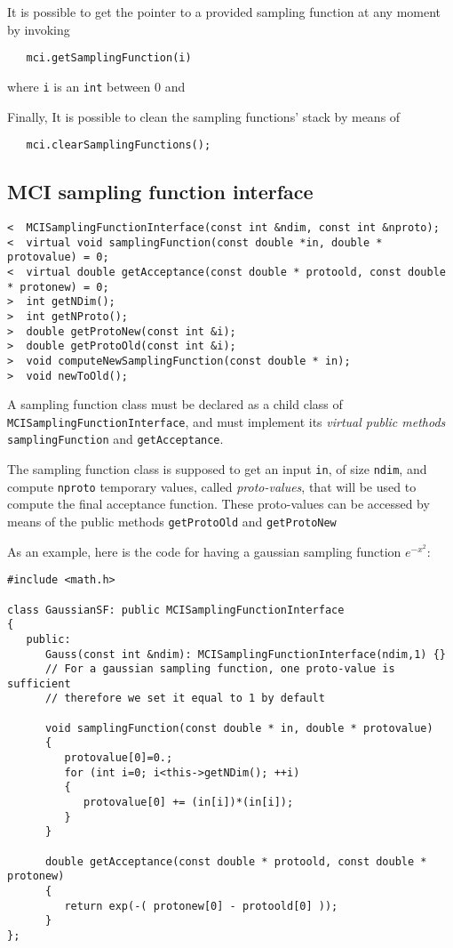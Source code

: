 \documentclass[11pt,a4paper,twoside]{article}
\begin{document}
It is possible to get the pointer to a provided sampling function at any moment by invoking
\begin{verbatim}
   mci.getSamplingFunction(i)
\end{verbatim}
where \verb+i+ is an \verb+int+ between $0$ and

Finally, It is possible to clean the sampling functions' stack by means of
\begin{verbatim}
   mci.clearSamplingFunctions();
\end{verbatim}


\subsection{MCI sampling function interface} %
\label{sub:mci_sampling_function_interface}

\begin{verbatim}
<  MCISamplingFunctionInterface(const int &ndim, const int &nproto);
<  virtual void samplingFunction(const double *in, double * protovalue) = 0;
<  virtual double getAcceptance(const double * protoold, const double * protonew) = 0;
>  int getNDim();
>  int getNProto();
>  double getProtoNew(const int &i);
>  double getProtoOld(const int &i);
>  void computeNewSamplingFunction(const double * in);
>  void newToOld();
\end{verbatim}

A sampling function class must be declared as a child class of \verb+MCISamplingFunctionInterface+, and must implement its \emph{virtual public methods} \verb+samplingFunction+ and \verb+getAcceptance+.

The sampling function class is supposed to get an input \verb+in+, of size \verb+ndim+, and compute \verb+nproto+ temporary values, called \emph{proto-values}, that will be used to compute the final acceptance function.
These proto-values can be accessed by means of the public methods \verb+getProtoOld+ and \verb+getProtoNew+

As an example, here is the code for having a gaussian sampling function $e^{-x^2}$:
\begin{verbatim}
#include <math.h>

class GaussianSF: public MCISamplingFunctionInterface
{
   public:
      Gauss(const int &ndim): MCISamplingFunctionInterface(ndim,1) {}
      // For a gaussian sampling function, one proto-value is sufficient
      // therefore we set it equal to 1 by default

      void samplingFunction(const double * in, double * protovalue)
      {
         protovalue[0]=0.;
         for (int i=0; i<this->getNDim(); ++i)
         {
            protovalue[0] += (in[i])*(in[i]);
         }
      }

      double getAcceptance(const double * protoold, const double * protonew)
      {
         return exp(-( protonew[0] - protoold[0] ));
      }
};
\end{verbatim}
\end{document}
